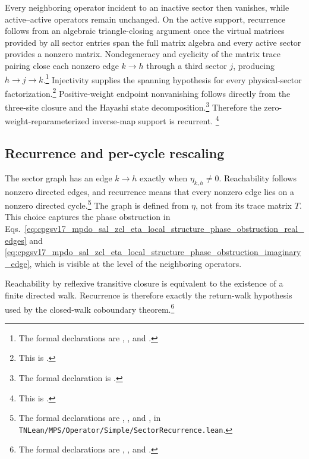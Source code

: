 \documentclass{article}
\begin{document}
Every neighboring operator incident to an inactive sector then vanishes, while
active--active operators remain unchanged. On the active support, recurrence
follows from an algebraic triangle-closing argument once the virtual matrices
provided by all sector entries span the full matrix algebra and every active
sector provides a nonzero matrix. Nondegeneracy and cyclicity of the matrix
trace pairing close each nonzero edge $k\to h$ through a third sector $j$,
producing $h\to j\to k$.\footnote{The formal declarations are
,
,
and
.}
Injectivity supplies the spanning hypothesis for every physical-sector
factorization.\footnote{This is
.}
Positive-weight endpoint nonvanishing follows directly from the three-site
closure and the Hayashi state decomposition.\footnote{The formal declaration
is .}
Therefore the zero-weight-reparameterized inverse-map support is recurrent.
\footnote{This is
.}

\subsection{Recurrence and per-cycle rescaling}

The sector graph has an edge $k\to h$ exactly when $\eta_{k,h}\neq 0$.
Reachability follows nonzero directed edges, and recurrence means that every
nonzero edge lies on a nonzero directed cycle.\footnote{The formal declarations
are ,
, and
, in
\texttt{TNLean/MPS/Operator/Simple/SectorRecurrence.lean}.}
The graph is defined from $\eta$, not from its trace matrix $T$. This choice
captures the phase obstruction in
Eqs.~\ref{eq:cpgsv17_mpdo_sal_zcl_eta_local_structure_phase_obstruction_real_edges}
and
\ref{eq:cpgsv17_mpdo_sal_zcl_eta_local_structure_phase_obstruction_imaginary_edge},
which is visible at the level of the neighboring operators.

Reachability by reflexive transitive closure is equivalent to the existence of
a finite directed walk. Recurrence is therefore exactly the return-walk
hypothesis used by the closed-walk coboundary theorem.\footnote{The formal
declarations are
,
, and
.}
\end{document}
